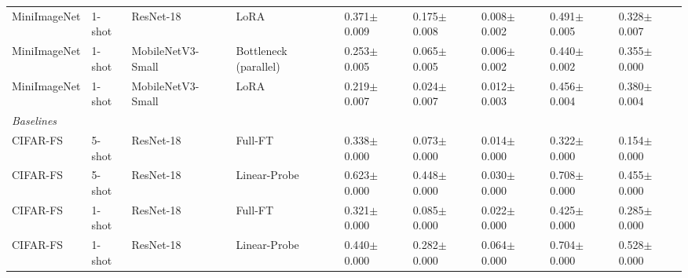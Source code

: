 \begin{table}[t]
\begin{tabular}{lllllllll}
MiniImageNet & 1-shot & ResNet-18 & LoRA & 0.371$\pm$0.009 & 0.175$\pm$0.008 & 0.008$\pm$0.002 & 0.491$\pm$0.005 & 0.328$\pm$0.007 \\
MiniImageNet & 1-shot & MobileNetV3-Small & Bottleneck (parallel) & 0.253$\pm$0.005 & 0.065$\pm$0.005 & 0.006$\pm$0.002 & 0.440$\pm$0.002 & 0.355$\pm$0.000 \\
MiniImageNet & 1-shot & MobileNetV3-Small & LoRA & 0.219$\pm$0.007 & 0.024$\pm$0.007 & 0.012$\pm$0.003 & 0.456$\pm$0.004 & 0.380$\pm$0.004 \\
\midrule
\multicolumn{9}{l}{\textit{Baselines}} \\
\midrule
CIFAR-FS & 5-shot & ResNet-18 & Full-FT & 0.338$\pm$0.000 & 0.073$\pm$0.000 & 0.014$\pm$0.000 & 0.322$\pm$0.000 & 0.154$\pm$0.000 \\
CIFAR-FS & 5-shot & ResNet-18 & Linear-Probe & 0.623$\pm$0.000 & 0.448$\pm$0.000 & 0.030$\pm$0.000 & 0.708$\pm$0.000 & 0.455$\pm$0.000 \\
CIFAR-FS & 1-shot & ResNet-18 & Full-FT & 0.321$\pm$0.000 & 0.085$\pm$0.000 & 0.022$\pm$0.000 & 0.425$\pm$0.000 & 0.285$\pm$0.000 \\
CIFAR-FS & 1-shot & ResNet-18 & Linear-Probe & 0.440$\pm$0.000 & 0.282$\pm$0.000 & 0.064$\pm$0.000 & 0.704$\pm$0.000 & 0.528$\pm$0.000 \\
\bottomrule
\end{tabular}
\end{table}
